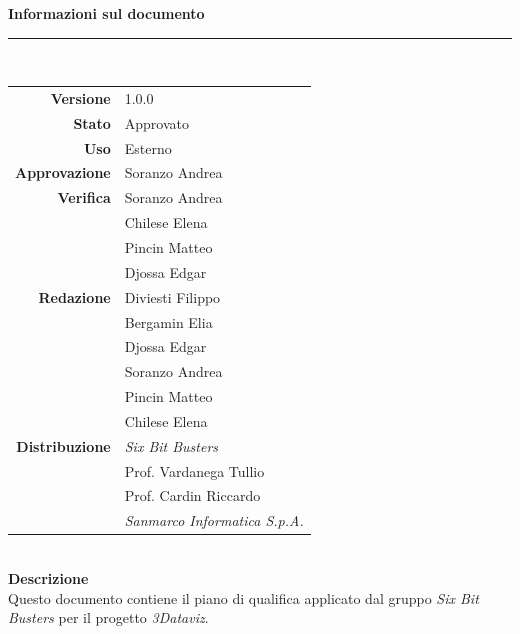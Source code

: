 \begin{titlepage}
\begin{center}
	\large \textbf{Informazioni sul documento} \\
	\rule{0.6\textwidth}{0.4pt}
	\\[0.5cm]
	\begin{tabular}{r|l}
		\textbf{Versione} & 1.0.0\\
		\textbf{Stato} & Approvato\\
		\textbf{Uso} & Esterno\\                         
		\textbf{Approvazione} & Soranzo Andrea\\                      
		\textbf{Verifica} & Soranzo Andrea\\ & Chilese Elena\\ & Pincin Matteo \\ & Djossa Edgar\\                         
		\textbf{Redazione} & Diviesti Filippo \\ & Bergamin Elia \\ & Djossa Edgar \\ & Soranzo Andrea \\ & Pincin Matteo \\ & Chilese Elena\\ 
		\textbf{Distribuzione} & \textit{Six Bit Busters} \\ & Prof. Vardanega Tullio \\ & Prof. Cardin Riccardo \\ & \textit{Sanmarco Informatica S.p.A.}
	\end{tabular}	
	\\[0.8cm]

	\large \textbf{Descrizione} \\
	Questo documento contiene il piano di qualifica applicato dal gruppo \textit{Six Bit Busters}
	per il progetto \textit{3Dataviz}.
	
	\end{center}
\end{titlepage}
